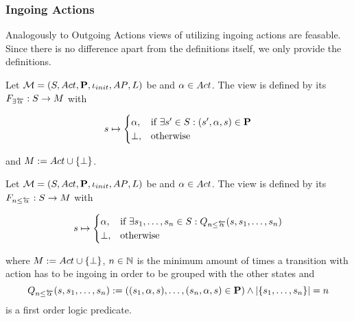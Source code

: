 \documentclass[preview]{standalone}
\begin{document}
\subsubsection{Ingoing Actions}
Analogously to Outgoing Actions views of utilizing ingoing actions are feasable. Since there is no difference apart from the definitions itself, we only provide the definitions.

\begin{definition}
	Let ${{{\mathcal{M}}}} = {{({S}, {Act}, {\textbf{P}}, {\iota_{init}}, {AP}, {L})}}$ be \chosengraphtypeN and ${\alpha} \in {Act}$. The view \viewhasinaction is defined by its \grpfctN ${{F_{\exists{\overleftarrow{\ensuremath{{\alpha}}}}}}} : {S} \to {\ensuremath{{M}}}$ with 
	
	\[
	{s} \mapsto
	\begin{cases}
		{\alpha},				& \text{if } \exists {s}' \in {S}: ({s}', {\alpha}, {s}) \in {\ensuremath{{\textbf{P}}}} \\
		{\bot},          	& \text{otherwise}
	\end{cases}
	\]
	
	and ${{M}} := {Act} \cup {\{\bot\}}$.	
	\label{def:mininaction}
\end{definition}	


\begin{definition}
	Let ${{{\mathcal{M}}}} = {{({S}, {Act}, {\textbf{P}}, {\iota_{init}}, {AP}, {L})}}$ be \chosengraphtypeN and ${\alpha} \in {Act}$. The view \viewmininaction is defined by its \grpfctN ${{F_{{n}\leq{\overleftarrow{\ensuremath{{\alpha}}}}}}} : {S} \to {M}$ with
	
	\[
	{s} \mapsto
	\begin{cases}
		{\alpha},				& \text{if } \exists {s}_1, \dots, {s}_{n} \in {S}:  {Q_{{n}\leq{\overleftarrow{\ensuremath{{\alpha}}}}}({s},{s}_1, \dots, {s}_{{n}})}\\
		{\bot},          	& \text{otherwise}
	\end{cases}
	\]
	
	where ${{M}} := {Act} \cup {\{\bot\}}$, ${n} \in {\mathbb{N}}$ is the minimum amount of times a transition with action \action has to be ingoing in order to be grouped with the other states and
	\[
	{Q_{{n}\leq{\overleftarrow{\ensuremath{{\alpha}}}}}({s},{s}_1, \dots, {s}_{{n}})} := (({s}_1, {\alpha}, {s}), \dots, ({s}_{n}, {\alpha}, {s}) \in {\ensuremath{{\textbf{P}}}}) \land |\{{s}_1, \dots, {s}_{n}\}| = {n}
	\]
	is a first order logic predicate.
	\label{def:viewmaxinaction}
\end{definition}
\end{document}

